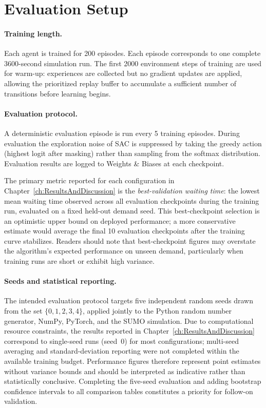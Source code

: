 \section{Evaluation Setup}
\label{sec:ExperimentalDesign_EvaluationSetup}

\paragraph{Training length.}
Each agent is trained for 200 episodes. Each episode corresponds to one complete 3600-second simulation run. The first 2000 environment steps of training are used for warm-up: experiences are collected but no gradient updates are applied, allowing the prioritized replay buffer to accumulate a sufficient number of transitions before learning begins.

\paragraph{Evaluation protocol.}
A deterministic evaluation episode is run every 5 training episodes. During evaluation the exploration noise of SAC is suppressed by taking the greedy action (highest logit after masking) rather than sampling from the softmax distribution. Evaluation results are logged to Weights \& Biases \citep{wandb} at each checkpoint.

The primary metric reported for each configuration in Chapter~\ref{ch:ResultsAndDiscussion} is the \emph{best-validation waiting time}: the lowest mean waiting time observed across all evaluation checkpoints during the training run, evaluated on a fixed held-out demand seed. This best-checkpoint selection is an optimistic upper bound on deployed performance; a more conservative estimate would average the final 10 evaluation checkpoints after the training curve stabilizes. Readers should note that best-checkpoint figures may overstate the algorithm's expected performance on unseen demand, particularly when training runs are short or exhibit high variance.

\paragraph{Seeds and statistical reporting.}
The intended evaluation protocol targets five independent random seeds drawn from the set $\{0, 1, 2, 3, 4\}$, applied jointly to the Python random number generator, NumPy, PyTorch, and the SUMO simulation. Due to computational resource constraints, the results reported in Chapter~\ref{ch:ResultsAndDiscussion} correspond to single-seed runs (seed~0) for most configurations; multi-seed averaging and standard-deviation reporting were not completed within the available training budget. Performance figures therefore represent point estimates without variance bounds and should be interpreted as indicative rather than statistically conclusive. Completing the five-seed evaluation and adding bootstrap confidence intervals to all comparison tables constitutes a priority for follow-on validation.

